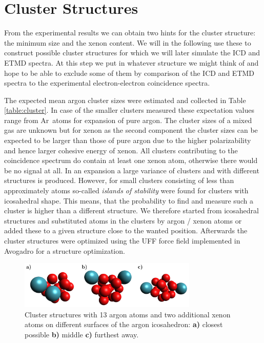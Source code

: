 \section{Cluster Structures}

From the experimental results we can obtain two hints for the cluster
structure: the minimum size and the xenon content. We will in the following
use these to construct possible cluster structures for which we will later
simulate the ICD and ETMD spectra. At this step we put in whatever structure
we might think of and hope to be able to exclude some of them by comparison of
the ICD and ETMD spectra to the experimental electron-electron coincidence
spectra.

The expected mean argon cluster sizes
were estimated and collected in Table \ref{table:cluster}.
In case of the smaller clusters measured
these expectation values range from \unit[3 -- 21]{Ar atoms} for
expansion of pure argon. The cluster sizes of a mixed gas are unknown but
for xenon as the second component the cluster sizes can be expected to
be larger than those of pure argon due to the higher polarizability
and hence larger cohesive energy of xenon. All clusters
contributing to the coincidence spectrum
do contain at least one xenon atom, otherwise there would be no signal at all.
In an expansion a large variance of clusters and with different structures
is produced. However, for small clusters consisting of less than
approximately \unit[1000]{atoms} so-called \emph{islands of stability} were
found for clusters with icosahedral shape. This means, that the probability
to find and measure such a cluster is higher than a different structure.
We therefore started from icosahedral structures and substituted atoms
in the clusters by
argon / xenon atoms or added these to a given structure close to the wanted
position. Afterwards the cluster structures were optimized using the
UFF force field \cite{} implemented in
Avogadro \cite{} for a structure optimization.

\begin{figure}[h]
 \centering
 \includegraphics[width=8.5cm]{pics/cluster_2_overview.pdf}
 \caption{Cluster structures with 13 argon atoms and two additional xenon
          atoms on different surfaces of the argon icosahedron:
          \textbf{a)} closest possible \textbf{b)} middle \textbf{c)}
          furthest away.}
 \label{figure:cluster_2_overview}
\end{figure}

